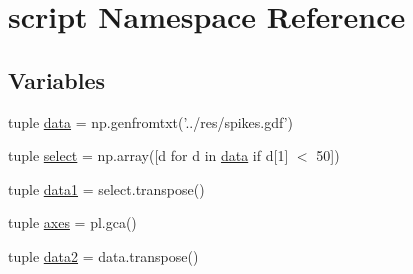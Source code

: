 \hypertarget{namespacescript}{\section{script Namespace Reference}
\label{namespacescript}
}
\subsection*{Variables}
\begin{DoxyCompactItemize}
\item 
tuple \hyperlink{namespacescript_a90bc184d1f00ebc30a749662dc49f24b}{data} = np.\-genfromtxt('../res/spikes.\-gdf')
\item 
tuple \hyperlink{namespacescript_aac11f1a96f0432e03e3d021dc4963841}{select} = np.\-array(\mbox{[}d for d in \hyperlink{namespacescript_a90bc184d1f00ebc30a749662dc49f24b}{data} if d\mbox{[}1\mbox{]} $<$ 50\mbox{]})
\item 
tuple \hyperlink{namespacescript_af71d9ea10b7c4687f80bf6bdaa9fdf06}{data1} = select.\-transpose()
\item 
tuple \hyperlink{namespacescript_a14f6cfd960d8e7b5e7518604e661c3f4}{axes} = pl.\-gca()
\item 
tuple \hyperlink{namespacescript_a2ed92b43747ae0022d67108638b1c455}{data2} = data.\-transpose()
\end{DoxyCompactItemize}


